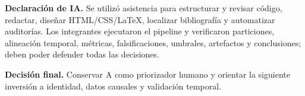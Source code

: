 \documentclass[10pt]{article}
\begin{document}
\vspace{2pt}
\begingroup\setlength{\fboxsep}{7pt}
\colorbox{pale}{\parbox{\dimexpr\linewidth-2\fboxsep\relax}{\scriptsize
\textbf{Declaración de IA.} Se utilizó asistencia para estructurar y revisar código, redactar, diseñar HTML/CSS/LaTeX, localizar bibliografía y automatizar auditorías. Los integrantes ejecutaron el pipeline y verificaron particiones, alineación temporal, métricas, falsificaciones, umbrales, artefactos y conclusiones; deben poder defender todas las decisiones.
\par\vspace{3pt}\color{navy}\textbf{Decisión final.} Conservar A como priorizador humano y orientar la siguiente inversión a identidad, datos causales y validación temporal.
}}
\endgroup
\end{document}
